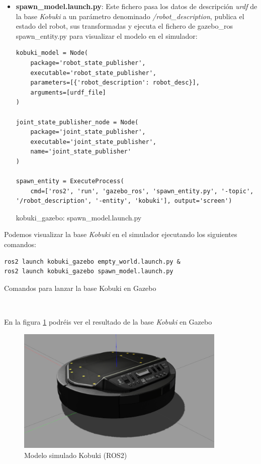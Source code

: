\begin{itemize}
	\item \textbf{spawn\_model.launch.py}: Este fichero pasa los datos de descripción \textit{urdf} de la base \textit{Kobuki} a un parámetro denominado \textit{/robot\_description}, publica el estado del robot, sus transformadas y ejecuta el fichero de gazebo\_ros spawn\_entity.py para visualizar el modelo en el simulador:
	
\begin{code}[H]
\begin{lstlisting}[frame=single]
kobuki_model = Node(
	package='robot_state_publisher',
	executable='robot_state_publisher',
	parameters=[{'robot_description': robot_desc}],
	arguments=[urdf_file]
)

joint_state_publisher_node = Node(
	package='joint_state_publisher',
	executable='joint_state_publisher',
	name='joint_state_publisher'
)

spawn_entity = ExecuteProcess(
	cmd=['ros2', 'run', 'gazebo_ros', 'spawn_entity.py', '-topic', '/robot_description', '-entity', 'kobuki'], output='screen')
\end{lstlisting}
\caption[kobuki\_gazebo: spawn\_model.launch.py]{kobuki\_gazebo: spawn\_model.launch.py}
\label{cod:kobuki_gazebo_spawn_model}
\end{code}
\end{itemize}

Podemos visualizar la base \textit{Kobuki} en el simulador ejecutando los siguientes comandos:\\

\begin{code}[H]
\begin{lstlisting}
ros2 launch kobuki_gazebo empty_world.launch.py &
ros2 launch kobuki_gazebo spawn_model.launch.py
\end{lstlisting}
\caption{Comandos para lanzar la base Kobuki en Gazebo}
\label{cod:comandos_kobuki_launch}
\end{code}\

En la figura \ref{fig:sim_kobuki_base} podréis ver el resultado de la base \textit{Kobuki} en Gazebo
\begin{figure} [H]
  \begin{center}
    \includegraphics[width=10cm]{imagenes/cap4/sim_kobuki_base.png}
  \end{center}
  \caption[Modelo simulado Kobuki (ROS2)]{Modelo simulado Kobuki (ROS2)}
  \label{fig:sim_kobuki_base}
\end{figure}\




